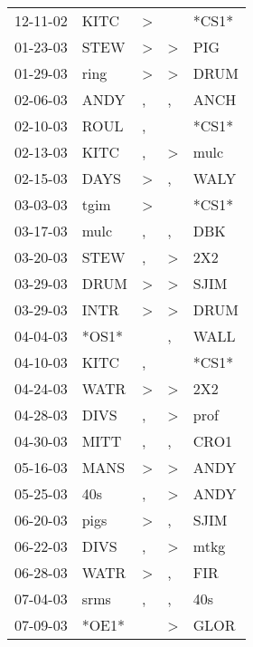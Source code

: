 \begin{supertabular}{lllll}
 12-11-02 &   KITC &     \textgreater &                  &  *CS1* \\
 01-23-03 &   STEW &     \textgreater &     \textgreater &    PIG \\
 01-29-03 &   ring &     \textgreater &     \textgreater &   DRUM \\
 02-06-03 &   ANDY &                , &                , &   ANCH \\
 02-10-03 &   ROUL &                , &                  &  *CS1* \\
 02-13-03 &   KITC &                , &     \textgreater &   mulc \\
 02-15-03 &   DAYS &     \textgreater &                , &   WALY \\
 03-03-03 &   tgim &     \textgreater &                  &  *CS1* \\
 03-17-03 &   mulc &                , &                , &    DBK \\
 03-20-03 &   STEW &                , &     \textgreater &    2X2 \\
 03-29-03 &   DRUM &     \textgreater &     \textgreater &   SJIM \\
 03-29-03 &   INTR &     \textgreater &     \textgreater &   DRUM \\
 04-04-03 &  *OS1* &                  &                , &   WALL \\
 04-10-03 &   KITC &                , &                  &  *CS1* \\
 04-24-03 &   WATR &     \textgreater &     \textgreater &    2X2 \\
 04-28-03 &   DIVS &                , &     \textgreater &   prof \\
 04-30-03 &   MITT &                , &                , &   CRO1 \\
 05-16-03 &   MANS &     \textgreater &     \textgreater &   ANDY \\
 05-25-03 &    40s &                , &     \textgreater &   ANDY \\
 06-20-03 &   pigs &     \textgreater &                , &   SJIM \\
 06-22-03 &   DIVS &                , &     \textgreater &   mtkg \\
 06-28-03 &   WATR &     \textgreater &                , &    FIR \\
 07-04-03 &   srms &                , &                , &    40s \\
 07-09-03 &  *OE1* &                  &     \textgreater &   GLOR \\

\end{supertabular}
